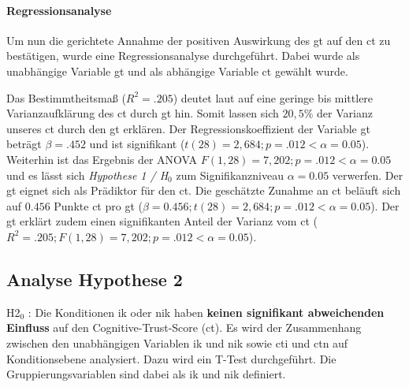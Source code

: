 \documentclass[a4paper,11pt]{article}%
\renewcommand{\\}{\vspace*{0.5\baselineskip} \newline}
\begin{document}
\paragraph{Regressionsanalyse}
Um nun die gerichtete Annahme der positiven Auswirkung des \ac{gt} auf den \ac{ct} zu bestätigen, wurde eine Regressionsanalyse durchgeführt. Dabei wurde als unabhängige Variable \ac{gt} und als abhängige Variable \ac{ct} gewählt wurde.
%

Das Bestimmtheitsmaß ($R^{2} = .205$) deutet laut \citep{cohen2013statistical} auf eine geringe bis mittlere Varianzaufklärung des \ac{ct} durch \ac{gt} hin. Somit lassen sich $20,5\%$ der Varianz unseres \ac{ct} durch den \ac{gt} erklären. \\
Der Regressionskoeffizient der Variable \ac{gt} beträgt $\beta = .452$ und ist signifikant ($t(28) = 2,684; p = .012 < \alpha = 0.05$). \\
Weiterhin ist das Ergebnis der ANOVA $F(1,28) = 7,202; p = .012 < \alpha = 0.05$ und es lässt sich \textit{Hypothese 1 / H$_{0}$} zum Signifikanzniveau $\alpha = 0.05$ verwerfen. \\
Der \ac{gt} eignet sich als Prädiktor für den \ac{ct}. Die geschätzte Zunahme an \ac{ct} beläuft sich auf $0.456$ Punkte \ac{ct} pro \ac{gt} ($\beta = 0.456; t(28) = 2,684; p = .012 < \alpha = 0.05$). \\
Der \ac{gt} erklärt zudem einen signifikanten Anteil der Varianz vom \ac{ct} ($R^{2} = .205; F(1,28) = 7,202; p = .012 < \alpha = 0.05$).


\newpage
	\subsection{Analyse Hypothese 2}
H2$_{0}$ : Die Konditionen \ac{ik} oder \ac{nik} haben \textbf{keinen signifikant abweichenden Einfluss} auf den Cognitive-Trust-Score (\ac{ct}).\\
Es wird der Zusammenhang zwischen den unabhängigen Variablen \ac{ik} und \ac{nik} sowie \ac{cti} und \ac{ctn} auf Konditionsebene analysiert. Dazu wird ein T-Test durchgeführt. Die Gruppierungsvariablen sind dabei als \ac{ik} und \ac{nik} definiert.
\end{document}

